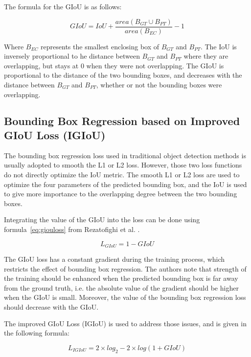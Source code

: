 The formula for the GIoU is as follows:

\begin{equation}
	GIoU = IoU + \frac{area(B_{GT} \cup B_{PT})}{area(B_{EC})} - 1
\end{equation}

Where $B_{EC}$ represents the smallest enclosing box of $B_{GT}$ and $B_{PT}$. The IoU is inversely proportional to he distance between $B_{GT}$ and $B_{PT}$ where they are overlapping, but stays at 0 when they were not overlapping. The GIoU is proportional to the distance of the two bounding boxes, and decreases with the distance between $B_{GT}$ and $B_{PT}$, whether or not the bounding boxes were overlapping.
\subsection{Bounding Box Regression based on Improved GIoU Loss (IGIoU)}
The bounding box regression loss used in traditional object detection methods is usually adopted to smooth the L1 or L2 loss. However, those two loss functions do not directly optimize the IoU metric. The smooth L1 or L2 loss are used to optimize the four parameters of the predicted bounding box, and the IoU is used to give more importance to the overlapping degree between the two bounding boxes. 

Integrating the value of the GIoU into the loss can be done using formula~\ref{eq:giouloss} from Rezatofighi et al. \cite{giou}.

\begin{equation}
	\label{eq:giouloss}
		L_{GIoU} = 1 - GIoU
\end{equation}

The GIoU loss has a constant gradient during the training process, which restricts the effect of bounding box regression. The authors note that strength of the training should be enhanced when the predicted bounding box is far away from the ground truth, i.e. the absolute value of the gradient should be higher when the GIoU is small. Moreover, the value of the bounding box regression loss should decrease with the GIoU. 

The improved GIoU Loss (IGIoU) is used to address those issues, and is given in the following formula:

\begin{equation}
	L_{IGIoU} = 2 \times log_2 - 2 \times log(1 + GIoU)
\end{equation}

